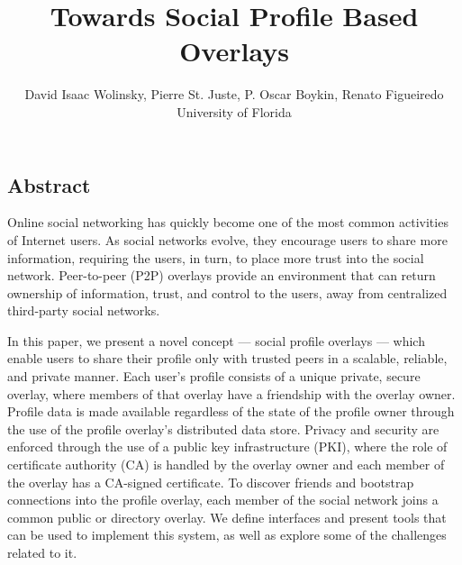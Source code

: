 \documentclass[letterpaper,twocolumn,10pt]{article}
\begin{document}
\title{\Large \bf Towards Social Profile Based Overlays}

\author{
David Isaac Wolinsky,
Pierre St. Juste,
P. Oscar Boykin,
Renato Figueiredo
\\
University of Florida
\\
}




\subsection*{Abstract}
Online social networking has quickly become one of the most common activities of Internet users.
As social networks evolve, they encourage users to share more information,
requiring the users, in turn, to place more trust into the social network.
Peer-to-peer (P2P) overlays provide an environment that can return ownership of
information, trust, and control to the users, away from centralized third-party
social networks.

In this paper, we present a novel concept --- social profile overlays ---
which enable users to share their profile only with trusted peers in a scalable,
reliable, and private manner.
Each user's profile consists
of a unique private, secure overlay, where members of that overlay have a
friendship with the overlay owner. Profile data is made available regardless of
the state of the profile owner through the use of the profile overlay's
distributed data store.  Privacy and security are enforced through the use of a
public key infrastructure (PKI), where the role of certificate authority (CA) is
handled by the overlay owner and each member of the overlay has a CA-signed
certificate.  To discover friends and bootstrap connections into the profile
overlay, each member of the social network joins a common public or directory
overlay.  We define interfaces and present tools that can be used to implement
this system, as well as explore some of the challenges related to it.
\end{document}
